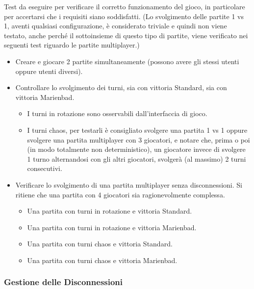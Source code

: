 Test da eseguire per verificare il corretto funzionamento del gioco, in particolare per accertarsi che i requisiti siano soddisfatti.
\newline
(Lo svolgimento delle partite 1 vs 1, aventi qualsiasi configurazione, è considerato triviale e quindi non viene testato, anche perché il sottoinsieme di questo tipo di partite, viene verificato nei seguenti test riguardo le partite multiplayer.)
\begin{itemize}
\item
	Creare e giocare 2 partite simultaneamente (possono avere gli stessi utenti oppure utenti diversi).
\item
	Controllare lo svolgimento dei turni, sia con vittoria Standard, sia con vittoria Marienbad.
	\begin{itemize}
	\item
		I turni in rotazione sono osservabili dall'interfaccia di gioco.
	\item
		I turni chaos, per testarli è consigliato svolgere una partita 1 vs 1 oppure svolgere una partita multiplayer con 3 giocatori, e notare che, prima o poi (in modo totalmente non deterministico), un giocatore invece di svolgere 1 turno alternandosi con gli altri giocatori, svolgerà (al massimo) 2 turni consecutivi.
	\end{itemize}
\item
	Verificare lo svolgimento di una partita multiplayer senza disconnessioni. Si ritiene che una partita con 4 giocatori sia ragionevolmente complessa.
	\begin{itemize}
	\item
		Una partita con turni in rotazione e vittoria Standard.
	\item
		Una partita con turni in rotazione e vittoria Marienbad.
	\item
		Una partita con turni chaos e vittoria Standard.
	\item
		Una partita con turni chaos e vittoria Marienbad.
	\end{itemize}
\end{itemize}

\subsubsection{Gestione delle Disconnessioni}

